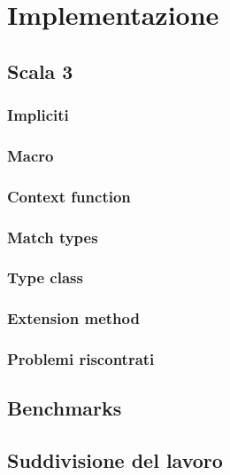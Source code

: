 \chapter{Implementazione}\label{ch:implementazione}
\section{Scala 3}\label{sec:scala-3}

\subsection{Impliciti}\label{subsec:impliciti}

\subsection{Macro}\label{subsec:macro}

\subsection{Context function}\label{subsec:context-function}

\subsection{Match types}\label{subsec:match-types}

\subsection{Type class}\label{subsec:type-class}

\subsection{Extension method}\label{subsec:extension-method}

\subsection{Problemi riscontrati}\label{subsec:problemi-riscontrati}

\section{Benchmarks}\label{sec:benchmarks}

\section{Suddivisione del lavoro}\label{sec:suddivisione-del-lavoro}

